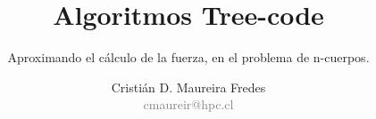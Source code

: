 \documentclass{beamer}
\author{\large Cristián D. Maureira Fredes\\\normalsize \textcolor{gray}{cmaureir@hpc.cl}}
\title{\Huge Algoritmos Tree-code}
\subtitle{Aproximando el cálculo de la fuerza, en el problema de n-cuerpos.}
\institute{Universidad Técnica\\ Federico Santa María}
\begin{document}
\begin{frame}[t,plain]
\titlepage
\end{frame}



\begin{frame}[t,plain]
\titlepage
\end{frame}
\end{document}
